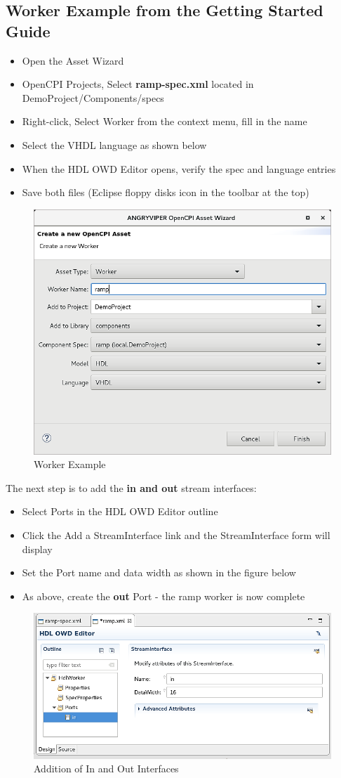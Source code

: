 \documentclass[10pt, a4paper, oneside]{article}
\begin{document}
\subsection{Worker Example from the Getting Started Guide}
\begin{itemize}
\item	Open the Asset Wizard
\item	OpenCPI Projects, Select \textbf{ramp-spec.xml} located in DemoProject/Components/specs
\item	Right-click, Select Worker from the context menu, fill in the name
\item	Select the VHDL language as shown below
\item	When the HDL OWD Editor opens, verify the spec and language entries
\item	Save both files (Eclipse floppy disks icon in the toolbar at the top)
 \end{itemize}
\begin{figure}[h!]
	\centering
	\caption{Worker Example}\label{fig:WorkerExample}
	\includegraphics[width=.65\textwidth]{WorkerExample.png}
 \end{figure}
The next step is to add the \textbf{in and out} stream interfaces:
\begin{itemize}
\item	Select Ports in the HDL OWD Editor outline
\item	Click the Add a StreamInterface link and the StreamInterface form will display
\item	Set the Port name and data width as shown in the figure below
\item	As above, create the \textbf{out} Port - the ramp worker is now complete
 \end{itemize}
\begin{figure}[h!]
	\centering
	\caption{Addition of In and Out Interfaces}\label{fig:AdditionofInandOutInterfaces}
	\includegraphics[width=.65\textwidth]{Additionofinandoutinterfaces.png}
 \end{figure}
\end{document}
